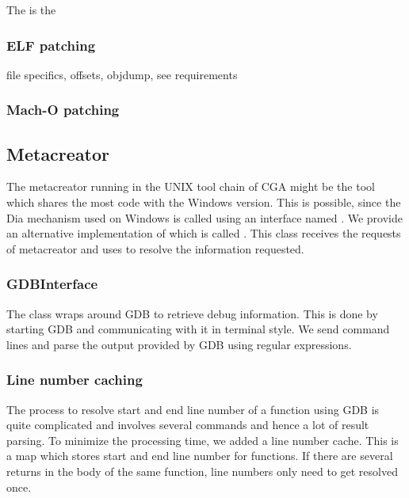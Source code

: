 The  is the 




\subsubsection{ELF patching} 

file specifics, offsets, objdump, see requirements


\subsubsection{Mach-O patching}




\subsection{Metacreator} The metacreator running in the UNIX tool chain of CGA might be the tool which shares the most code with the Windows version. This is possible, since the Dia mechanism used on Windows is called using an interface named . We provide an alternative implementation of  which is called . This class receives the requests of metacreator and uses  to resolve the information requested.

\subsubsection{GDBInterface} The  class wraps around GDB to retrieve debug information. This is done by starting GDB and communicating with it in terminal style. We send command lines and parse the output provided by GDB using regular expressions. 

\subsubsection{Line number caching} The process to resolve start and end line number of a function using GDB is quite complicated and involves several commands and hence a lot of result parsing. To minimize the processing time, we added a line number cache. This is a map which stores start and end line number for functions. If there are several returns in the body of the same function, line numbers only need to get resolved once.
